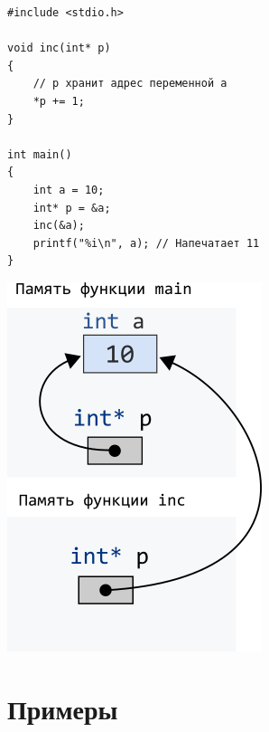 \documentclass[10pt]{article}
\begin{document}
\begin{multicols}{2}
\noindent
\begin{lstlisting}
#include <stdio.h>

void inc(int* p)
{
    // p хранит адрес переменной a
    *p += 1; 
}

int main()
{
    int a = 10;
    int* p = &a;
    inc(&a);
    printf("%i\n", a); // Напечатает 11
}
\end{lstlisting}

\begin{center}
\includegraphics[scale=0.62]{../images/intpassbypointer.png}
\end{center}
\end{multicols}

\section*{Примеры}
\end{document}
